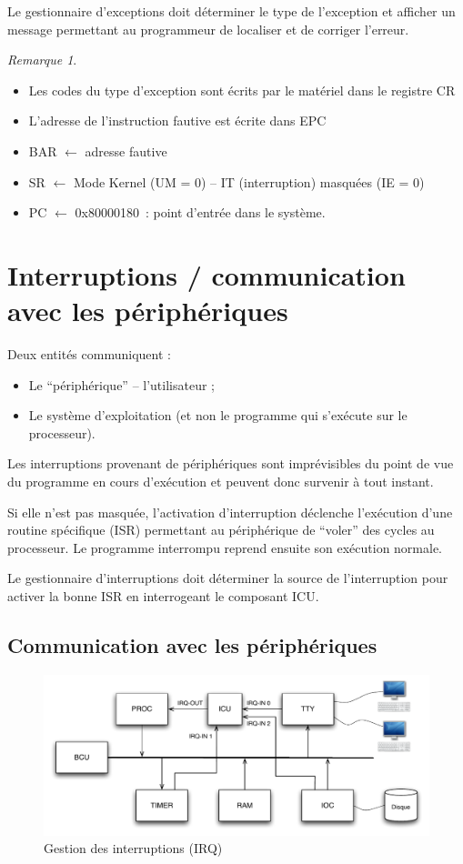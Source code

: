 \documentclass[11pt,english,french]{scrreprt}
\theoremstyle{remark}
\newtheorem*{rem*}{Remarque}
\theoremstyle{definition}
\begin{document}
Le gestionnaire d'exceptions doit déterminer le type de l'exception et afficher un message permettant au programmeur de localiser et de corriger l'erreur.

\begin{rem*}\hfill
	\begin{itemize}
	\item Les codes du type d'exception sont écrits par le matériel dans le registre CR
	\item L'adresse de l'instruction fautive est écrite dans EPC
	\item BAR $\leftarrow$ adresse fautive
	\item SR $\leftarrow$ Mode Kernel (UM = 0) -- IT (interruption) masquées (IE = 0)
	\item PC $\leftarrow$ 0x80000180~: point d'entrée dans le système.
	\end{itemize}
\end{rem*}

\section{Interruptions / communication avec les périphériques} %

Deux entités communiquent :\begin{itemize}
	\item Le ``périphérique'' -- l'utilisateur ;
	\item Le système d'exploitation (et non le programme qui s'exécute sur le processeur).
\end{itemize}

Les interruptions provenant de périphériques sont imprévisibles du point de vue du programme en cours d'exécution et peuvent donc survenir à tout instant.

Si elle n'est pas masquée, l'activation d'interruption déclenche l'exécution d'une routine spécifique (ISR) permettant au périphérique de ``voler'' des cycles au processeur. Le programme interrompu reprend ensuite son exécution normale. 

Le gestionnaire d'interruptions doit déterminer la source de l'interruption pour activer la bonne ISR en interrogeant le composant ICU. 

\subsection{Communication avec les périphériques} %

\begin{figure}[!h]
	\center
	\includegraphics[scale=.5]{diagrammes/ICU-bus}
	\caption{Gestion des interruptions (IRQ)}
\end{figure}
\end{document}
